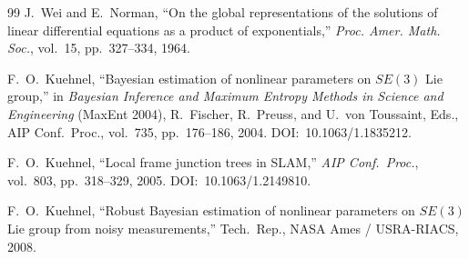 \documentclass[journal]{IEEEtran}
\begin{document}
\begin{thebibliography}{99}
J.~Wei and E.~Norman,
``On the global representations of the solutions of linear 
differential equations as a product of exponentials,''
\emph{Proc. Amer. Math. Soc.}, vol.~15, pp.~327--334, 1964.
 
F.~O.~Kuehnel,
``Bayesian estimation of nonlinear parameters on $SE(3)$ 
Lie group,''
in \emph{Bayesian Inference and Maximum Entropy Methods 
in Science and Engineering} (MaxEnt 2004),
R.~Fischer, R.~Preuss, and U.~von Toussaint, Eds.,
AIP Conf.\ Proc., vol.~735, pp.~176--186, 2004.
DOI:~10.1063/1.1835212.
 
F.~O.~Kuehnel,
``Local frame junction trees in SLAM,''
\emph{AIP Conf.\ Proc.}, vol.~803, pp.~318--329, 2005.
DOI:~10.1063/1.2149810.
 
F.~O.~Kuehnel,
``Robust Bayesian estimation of nonlinear parameters on 
$SE(3)$ Lie group from noisy measurements,''
Tech.\ Rep., NASA Ames / USRA-RIACS, 2008.
 
\end{thebibliography}
\end{document}
